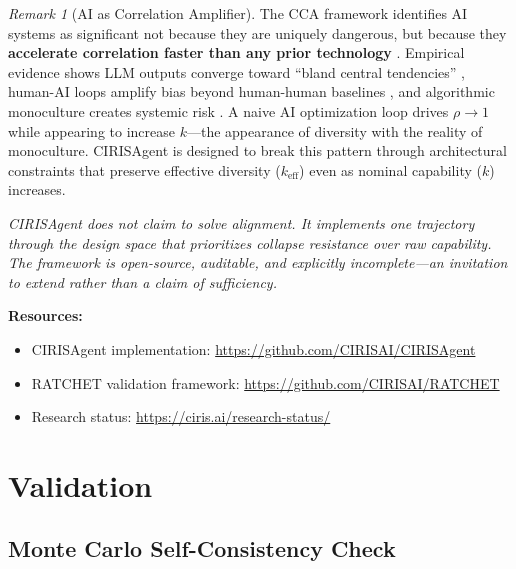 \documentclass[11pt,a4paper]{article}
\theoremstyle{definition}
\theoremstyle{remark}
\newtheorem{remark}{Remark}[section]
\newcommand{\keff}{k_{\text{eff}}}
\begin{document}
\begin{remark}[AI as Correlation Amplifier]
The CCA framework identifies AI systems as significant not because they are uniquely dangerous, but because they \textbf{accelerate correlation faster than any prior technology} \cite{homogenization2025, chi2025}. Empirical evidence shows LLM outputs converge toward ``bland central tendencies'' \cite{shumailov2024}, human-AI loops amplify bias beyond human-human baselines \cite{glickman2024}, and algorithmic monoculture creates systemic risk \cite{cepr2025}. A naive AI optimization loop drives $\rho \to 1$ while appearing to increase $k$---the appearance of diversity with the reality of monoculture. CIRISAgent is designed to break this pattern through architectural constraints that preserve effective diversity ($\keff$) even as nominal capability ($k$) increases.
\end{remark}

\medskip
\noindent\textit{CIRISAgent does not claim to solve alignment. It implements one trajectory through the design space that prioritizes collapse resistance over raw capability. The framework is open-source, auditable, and explicitly incomplete---an invitation to extend rather than a claim of sufficiency.}

\medskip
\noindent\textbf{Resources:}
\begin{itemize}[noitemsep]
    \item CIRISAgent implementation: \url{https://github.com/CIRISAI/CIRISAgent}
    \item RATCHET validation framework: \url{https://github.com/CIRISAI/RATCHET}
    \item Research status: \url{https://ciris.ai/research-status/}
\end{itemize}

\section{Validation}

\subsection{Monte Carlo Self-Consistency Check}
\label{sec:mc-selfcheck}
\end{document}
